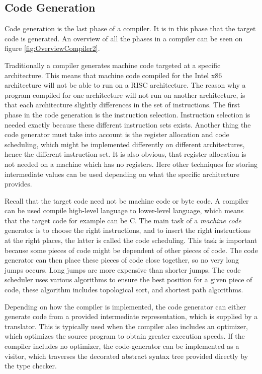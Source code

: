 \subsection{Code Generation}
Code generation is the last phase of a compiler. It is in this phase that the target code is generated. An overview of all the phases in a compiler can be seen on figure \ref{fig:OverviewCompiler2}.

Traditionally a compiler generates machine code targeted at a specific architecture. This means that machine code compiled for the Intel x86 architecture will not be able to run on a RISC architecture. The reason why a program compiled for one architecture will not run on another architecture, is that each architecture slightly differences in the set of instructions. The first phase in the code generation is the instruction selection. Instruction selection is needed exactly because these different instruction sets exists. Another thing the code generator must take into account is the register allocation and code scheduling, which might be implemented differently on different architectures, hence the different instruction set. It is also obvious, that register allocation is not needed on a machine which has no registers. Here other techniques for storing intermediate values can be used depending on what the specific architecture provides.

Recall that the target code need not be machine code or byte code. A compiler can be used compile high-level language to lower-level language, which means that the target code for example can be C. The main task of a \emph{machine code} generator is to choose the right instructions, and to insert the right instructions at the right places, the latter is called the code scheduling. This task is important because some pieces of code might be dependent of other pieces of code. The code generator can then place these pieces of code close together, so no very long jumps occurs. Long jumps are more expensive than shorter jumps. The code scheduler uses various algorithms to ensure the best position for a given piece of code, these algorithm includes topological sort, and shortest path algorithms.

Depending on how the compiler is implemented, the code generator can either generate code from a provided intermediate representation, which is supplied by a translator. This is typically used when the compiler also includes an optimizer, which optimizes the source program to obtain greater execution speeds. If the compiler includes no optimizer, the code-generator can be implemented as a visitor, which traverses the decorated abstract syntax tree provided directly by the type checker.